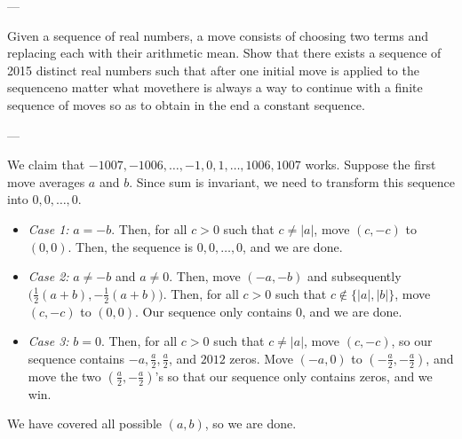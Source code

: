 
---

Given a sequence of real numbers, a move consists of choosing two terms and replacing each with their arithmetic mean. Show that there exists a sequence of 2015 distinct real numbers such that after one initial move is applied to the sequence\textemdash no matter what move\textemdash there is always a way to continue with a finite sequence of moves so as to obtain in the end a constant sequence.

---

We claim that $-1007,-1006,\ldots,-1,0,1,\ldots,1006,1007$ works. Suppose the first move averages $a$ and $b$. Since sum is invariant, we need to transform this sequence into $0,0,\ldots,0$.
\begin{itemize}
    \item \textit{Case 1:} $a=-b$. Then, for all $c>0$ such that $c\ne |a|$, move $(c,-c)$ to $(0,0)$. Then, the sequence is $0,0,\ldots,0$, and we are done.
    \item \textit{Case 2:} $a\ne -b$ and $a\ne 0$. Then, move $(-a,-b)$ and subsequently $\big(\tfrac12(a+b),-\tfrac12(a+b)\big)$. Then, for all $c>0$ such that $c\notin\{|a|,|b|\}$, move $(c,-c)$ to $(0,0)$. Our sequence only contains $0$, and we are done.
    \item \textit{Case 3:} $b=0$. Then, for all $c>0$ such that $c\ne |a|$, move $(c,-c)$, so our sequence contains $-a,\tfrac a2,\tfrac a2$, and $2012$ zeros. Move $(-a,0)$ to $(-\tfrac a2,-\tfrac a2)$, and move the two $(\tfrac a2,-\tfrac a2)$'s so that our sequence only contains zeros, and we win.
\end{itemize}
We have covered all possible $(a,b)$, so we are done.
